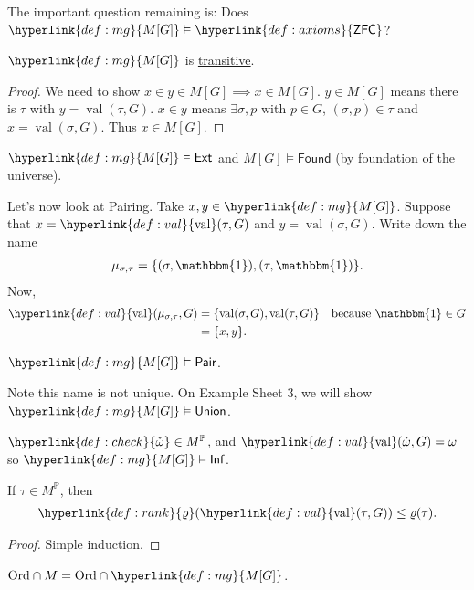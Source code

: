 \documentclass{article}
\newcommand{\1}{\mathbbm{1}}
\DeclareMathOperator{\val}{val}
\let\models\vDash
\begin{document}
The important question remaining is: Does $\hyperlink{def:mg}{M[G]} \models \hyperlink{def:axioms}{\textsf{ZFC}}$?
\begin{lemma}
  $\hyperlink{def:mg}{M[G]}$ is \hyperlink{def:transitive}{transitive}.
\end{lemma}
\begin{proof}
  We need to show $x \in y \in M[G] \implies x \in M[G]$.
  $y \in M[G]$ means there is $\tau$ with $y = \val(\tau,G)$.
  $x \in y$ means $\exists \sigma,p$ with $p \in G$, $(\sigma,p) \in \tau$ and $x = \val(\sigma,G)$.
  Thus $x \in M[G]$.
\end{proof}
\begin{cor}
  $\hyperlink{def:mg}{M[G] }\models \textsf{Ext}$ and $M[G] \models \textsf{Found}$ (by foundation of the universe).
\end{cor}
Let's now look at Pairing. Take $x,y \in \hyperlink{def:mg}{M[G]}$.
Suppose that $x = \hyperlink{def:val}{\val}(\tau,G)$ and $y = \val(\sigma,G)$.
Write down the name
\begin{align*}
  \mu_{\sigma,\tau} = \{(\sigma,\mathbbm{1}), (\tau,\mathbbm{1})\}.
\end{align*}
Now,
\begin{align*}
  \hyperlink{def:val}{\val}(\mu_{\sigma,\tau},G) &= \{\val(\sigma,G),\val(\tau,G)\} \quad \text{because } \mathbbm{1} \in G \\
                            &= \{x,y\}.
\end{align*}
\begin{prop}
  $\hyperlink{def:mg}{M[G]} \models \textsf{Pair}$.
\end{prop}
Note this name is not unique.
On Example Sheet 3, we will show $\hyperlink{def:mg}{M[G]} \models \textsf{Union}$.
\begin{cor}
  $\hyperlink{def:check}{\check{\omega}} \in M^{\mathbb{P}}$, and $\hyperlink{def:val}{\val}(\check{\omega},G) = \omega$ so $\hyperlink{def:mg}{M[G]} \models \textsf{Inf}$.
\end{cor}
\begin{lemma}
  If $\tau \in M^{\mathbb{P}}$, then
  \begin{align*}
    \hyperlink{def:rank}{\varrho}(\hyperlink{def:val}{\val}(\tau,G)) \leq \varrho(\tau).
  \end{align*}
\end{lemma}
\begin{proof}
  Simple induction.
\end{proof}
\begin{cor}
  $\text{Ord} \cap M = \text{Ord} \cap \hyperlink{def:mg}{M[G]}$.
\end{cor}
\end{document}
